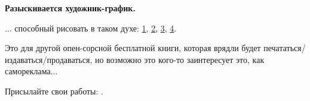 \vspace*{\fill}

\normalsize \textbf{Разыскивается художник-график.}

\bigskip
\bigskip
\bigskip

... способный рисовать в таком духе:
\href{https://github.com/DennisYurichev/RE-for-beginners/blob/master/cover.jpg}{1},
\href{https://github.com/DennisYurichev/RE-for-beginners/blob/master/cover2.jpg}{2},
\href{https://github.com/DennisYurichev/RE-for-beginners/blob/master/cover3.jpg}{3},
\href{https://github.com/DennisYurichev/RE-for-beginners/blob/master/cover4.jpg}{4}.

Это для другой опен-сорсной бесплатной книги, которая врядли будет печататься/издаваться/продаваться,
но возможно это кого-то заинтересует это, как самореклама...

Присылайте свои работы: \EMAIL.

\bigskip
\bigskip
\bigskip

\vspace*{\fill}
\vfill
